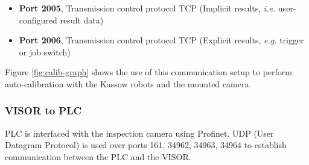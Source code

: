 \begin{itemize}
  \item \textbf{Port 2005}, Transmission control protocol TCP (Implicit results, \textit{i.e.} user-configured result data)
  \item \textbf{Port 2006}, Transmission control protocol TCP (Explicit results, \textit{e.g.} trigger or job switch)
\end{itemize}

Figure \ref{fig:calib-graph} shows the use of this communication setup to perform auto-calibration with the Kassow robots and the mounted camera.

\subsubsection{VISOR to PLC}
PLC is interfaced with the inspection camera using Profinet.
UDP (User Datagram Protocol) is used over ports 161, 34962, 34963, 34964 to establish communication between the PLC and the VISOR. \cite{visor_communication_manual}

